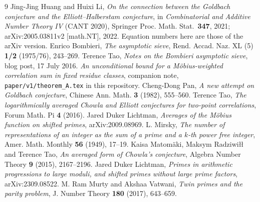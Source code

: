 \documentclass[11pt,a4paper]{article}
\theoremstyle{plain}
\theoremstyle{definition}
\begin{document}
\begin{thebibliography}{9}
 Jing-Jing Huang and Huixi Li, \emph{On the connection
between the Goldbach conjecture and the Elliott--Halberstam
conjecture}, in \emph{Combinatorial and Additive Number Theory IV}
(CANT 2020), Springer Proc. Math. Stat.\ \textbf{347}, 2021;
arXiv:2005.03811v2 [math.NT], 2022. Equation numbers here are those of
the arXiv version.
 Enrico Bombieri, \emph{The asymptotic sieve},
Rend. Accad. Naz. XL (5) \textbf{1/2} (1975/76), 243--269.
 Terence Tao, \emph{Notes on the Bombieri asymptotic
sieve}, blog post, 17 July 2016.
 \emph{An unconditional bound for a M\"obius-weighted
correlation sum in fixed residue classes}, companion note,
\texttt{paper/v1/theorem\_A.tex} in this repository.
 Cheng-Dong Pan, \emph{A new attempt on Goldbach
conjecture}, Chinese Ann. Math. \textbf{3} (1982), 555--560.
 Terence Tao, \emph{The logarithmically averaged Chowla
and Elliott conjectures for two-point correlations}, Forum Math. Pi
\textbf{4} (2016).
 Jared Duker Lichtman, \emph{Averages of the M\"obius
function on shifted primes}, arXiv:2009.08969.
 L. Mirsky, \emph{The number of representations
of an integer as the sum of a prime and a $k$-th power free
integer}, Amer. Math. Monthly \textbf{56} (1949), 17--19.
 Kaisa Matom\"aki, Maksym Radziwi\l{}\l{}
and Terence Tao, \emph{An averaged form of Chowla's conjecture},
Algebra Number Theory \textbf{9} (2015), 2167--2196.
 Jared Duker Lichtman, \emph{Primes in arithmetic
progressions to large moduli, and shifted primes without large prime
factors}, arXiv:2309.08522.
 M. Ram Murty and Akshaa Vatwani, \emph{Twin primes and
the parity problem}, J. Number Theory \textbf{180} (2017), 643--659.
\end{thebibliography}
\end{document}
